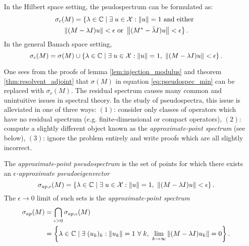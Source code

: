 \begin{corollary}
    In the Hilbert space setting, the psudospectrum can be formulated as: 
    \begin{multline}
        \label{eq:pseudospectrum}
        \sigma_\epsilon (M) = \left\{ \lambda \in \mathbb{C} \mid \exists\; u \in \mathcal{X} : 
        \| u \| = 1 \text{ and either }\right. \\
        \left.\left\| (M - \lambda I) u \right\| < \epsilon \text{ or } 
        \left\| (M^* - \bar{\lambda} I) u \right\| < \epsilon \right\} .  
    \end{multline}
    In the general Banach space setting,
    \begin{equation}
        \label{eq:pseudospec_min}
        \sigma_\epsilon (M) = \sigma (M) \cup \left\{ \lambda \in \mathbb{C} \mid \exists\; u \in \mathcal{X} : 
        \| u \| = 1,\ \left\| (M - \lambda I) u \right\| < \epsilon \right\} . 
    \end{equation}
\end{corollary}

One sees from the proofs of lemma \ref{lem:injection_modulus} and theorem 
\ref{thm:resolvent_adjoint} that $\sigma (M)$ in equation \ref{eq:pseudospec_min} can be 
replaced with $\sigma_r (M)$. The residual spectrum causes many common and unintuitive 
issues in spectral theory. In the study of pseudospectra, this issue is alleviated in 
one of three ways: $(1)$: consider only classes of operators which have no residual 
spectrum (e.g. finite-dimensional or compact operators), $(2)$: compute a slightly 
different object known as the \emph{approximate-point spectrum} (see below), $(3)$: 
ignore the problem entirely and write proofs which are all slightly incorrect. 

\begin{definition}
    \label{def:approximate_point_spec}
    The \emph{approximate-point pseudospectrum} is the set of points for which there 
    exists an \emph{$\epsilon$-approximate pseudoeigenvector}
    \begin{equation}
        \sigma_{ap, \epsilon} (M) = \left\{ \lambda \in \bbC \mid 
            \exists\; u \in \scrX : \left\| u \right\| = 1,\ 
            \left\| (M - \lambda I) u \right\| < \epsilon 
        \right\} . 
    \end{equation}
    The $\epsilon \to 0$ limit of such sets is the \emph{approximate-point spectrum}
    \begin{align}
        \sigma_{ap} (M) &= \bigcap_{\epsilon > 0} \sigma_{ap, \epsilon} (M) \\
        &= \left\{ \lambda \in \bbC \mid
            \exists\; (u_k)_k : \left\| u_k \right\| = 1\ \forall\; k,\ 
            \lim_{k \to \infty} \left\| (M - \lambda I) u_k \right\| = 0
        \right\} . 
    \end{align}
\end{definition}


